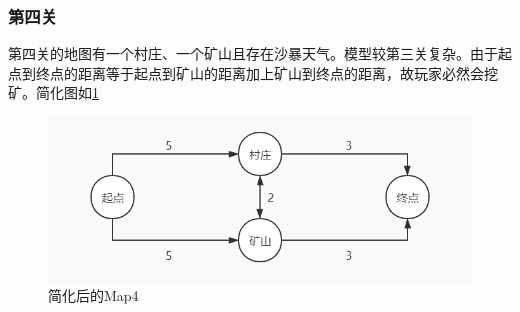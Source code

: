 \documentclass[withoutpre]{cumcmthesis} %
\begin{document}
\subsubsection{第四关}
第四关的地图有一个村庄、一个矿山且存在沙暴天气。模型较第三关复杂。由于起点到终点的距离等于起点到矿山的距离加上矿山到终点的距离，故玩家必然会挖矿。简化图如\cref{fig:map4}
\begin{figure}[H]
    \centering
    \includegraphics[scale=0.5]{figures/map4.jpg}
    \caption{简化后的Map4}
    \label{fig:map4}
\end{figure}
\end{document}
